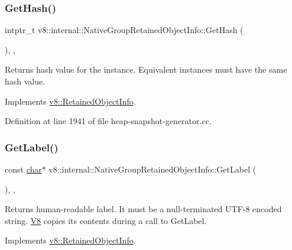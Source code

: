 \subsubsection{\texorpdfstring{Get\+Hash()}{GetHash()}}
{\footnotesize\ttfamily intptr\+\_\+t v8\+::internal\+::\+Native\+Group\+Retained\+Object\+Info\+::\+Get\+Hash (\begin{DoxyParamCaption}{ }\end{DoxyParamCaption})\hspace{0.3cm}{\ttfamily [inline]}, {\ttfamily [override]}, {\ttfamily [virtual]}}

Returns hash value for the instance. Equivalent instances must have the same hash value. 

Implements \mbox{\hyperlink{classv8_1_1RetainedObjectInfo_a6fdbfa242b95615e63f08433419c8066}{v8\+::\+Retained\+Object\+Info}}.



Definition at line 1941 of file heap-\/snapshot-\/generator.\+cc.

\mbox{\label{classv8_1_1internal_1_1NativeGroupRetainedObjectInfo_a8b9d63379a9e6647ecbe169d6f9223ee}} 
\subsubsection{\texorpdfstring{Get\+Label()}{GetLabel()}}
{\footnotesize\ttfamily const \mbox{\hyperlink{classchar}{char}}$\ast$ v8\+::internal\+::\+Native\+Group\+Retained\+Object\+Info\+::\+Get\+Label (\begin{DoxyParamCaption}{ }\end{DoxyParamCaption})\hspace{0.3cm}{\ttfamily [inline]}, {\ttfamily [override]}, {\ttfamily [virtual]}}

Returns human-\/readable label. It must be a null-\/terminated U\+T\+F-\/8 encoded string. \mbox{\hyperlink{classv8_1_1internal_1_1V8}{V8}} copies its contents during a call to Get\+Label. 

Implements \mbox{\hyperlink{classv8_1_1RetainedObjectInfo_ad19106fc7f0499fd45005077551d54c0}{v8\+::\+Retained\+Object\+Info}}.



